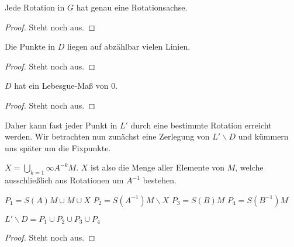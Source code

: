 \begin{lemma}
\begin{lemma} \label{lemma:eine_rot_achse}
Jede Rotation in $G$ hat genau eine Rotationsachse.
\end{lemma}
\begin{proof} 
Steht noch aus.
\end{proof}

\begin{lemma} \label{lemma:abz_fixpunkte}
Die Punkte in $D$ liegen auf abzählbar vielen Linien.
\end{lemma}
\begin{proof} 
Steht noch aus.
\end{proof}

\begin{lemma} \label{lemma:lebesgue_mass_D}
$D$ hat ein Lebesgue-Maß von $0$.
\end{lemma}
\begin{proof} 
Steht noch aus.
\end{proof}

Daher kann fast jeder Punkt in $L'$ durch eine bestimmte Rotation erreicht werden. Wir betrachten nun zunächst eine 
Zerlegung von $L'\backslash D$ und kümmern uns später um die Fixpunkte.

\begin{definition}[Vereinigung X] \label{def:vereinigung_x} 
$X=\bigcup\limits_{k=1}{\infty}A^{-k}M$. $X$ ist also die Menge aller Elemente von $M$, welche ausschließlich aus Rotationen
um $A^{-1}$ bestehen.
\end{definition}

\begin{definition} \label{def:zerlegung_L_D} 
$P_1=S(A)M\cup M\cup X$
$P_2=S(A^{-1})M\backslash X$
$P_3=S(B)M$
$P_4=S(B^{-1})M$
\end{definition}

\begin{lemma} \label{lemma:vereinigung_zerlegung}
$L'\backslash D=P_1\cup P_2\cup P_3\cup P_4$
\end{lemma}
\begin{proof} 
Steht noch aus.
\end{proof}


\end{lemma}
